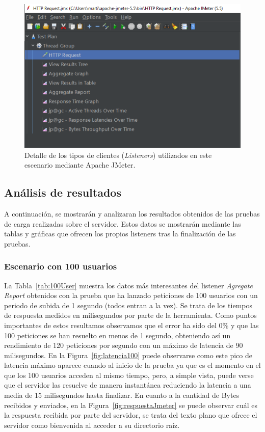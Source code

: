 \begin{figure}[h]
\centering
\includegraphics[scale=0.8]{images/listeners.png}
\caption[Listeners seleccionados]{Detalle de los tipos de clientes (\emph{Listeners}) utilizados en este escenario mediante Apache JMeter.}%
\label{fig:listeners}
\end{figure}

\subsection{Análisis de resultados}

A continuación, se mostrarán y analizaran los resultados obtenidos de las pruebas de carga realizadas sobre el servidor. Estos datos se mostrarán mediante las tablas y gráficas que ofrecen los propios listeners tras la finalización de las pruebas. 

\subsubsection{Escenario con 100 usuarios}


La Tabla~\ref{tab:100User} muestra los datos más interesantes del listener \textit{Agregate Report} obtenidos con la prueba que ha lanzado peticiones de 100 usuarios con un periodo de subida de 1 segundo (todos entran a la vez). Se trata de los tiempos de respuesta medidos en milisegundos por parte de la herramienta. Como puntos importantes de estos resultamos observamos que el error ha sido del 0\% y que las 100 peticiones se han resuelto en menos de 1 segundo, obteniendo así un rendimiento de 120 peticiones por segundo con un máximo de latencia de 90 milisegundos. En la Figura~\ref{fig:latencia100} puede observarse como este pico de latencia máximo aparece cuando al inicio de la prueba ya que es el momento en el que los 100 usuarios acceden al mismo tiempo, pero, a simple vista, puede verse que el servidor las resuelve de manera instantánea reduciendo la latencia a una media de 15 milisegundos hasta finalizar. 
En cuanto a la cantidad de Bytes recibidos y enviados, en la Figura~\ref{fig:respuestaJmeter} se puede observar cuál es la respuesta recibida por parte del servidor, se trata del texto plano que ofrece el servidor como bienvenida al acceder a su directorio raíz.\\

